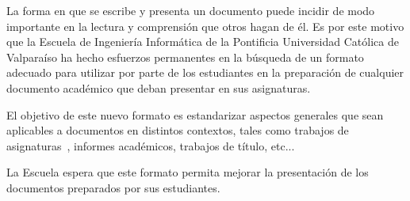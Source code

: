 
La forma en que se escribe y presenta un documento puede incidir de modo
importante en la lectura y comprensión que otros hagan de él. Es por este motivo
que la Escuela de Ingeniería Informática de la Pontificia Universidad Católica
de Valparaíso ha hecho esfuerzos permanentes en la búsqueda de un formato
adecuado para utilizar por parte de los estudiantes en la preparación de
cualquier documento académico que deban presentar en sus asignaturas.

El objetivo de este nuevo formato es estandarizar aspectos generales que sean
aplicables a documentos en distintos contextos, tales como trabajos de
asignaturas~\cite{AptCambridge2003,AptTOPLAS1998}, informes académicos,
trabajos de título, etc...

La Escuela espera que este formato permita mejorar la presentación de los
documentos preparados por sus estudiantes.


